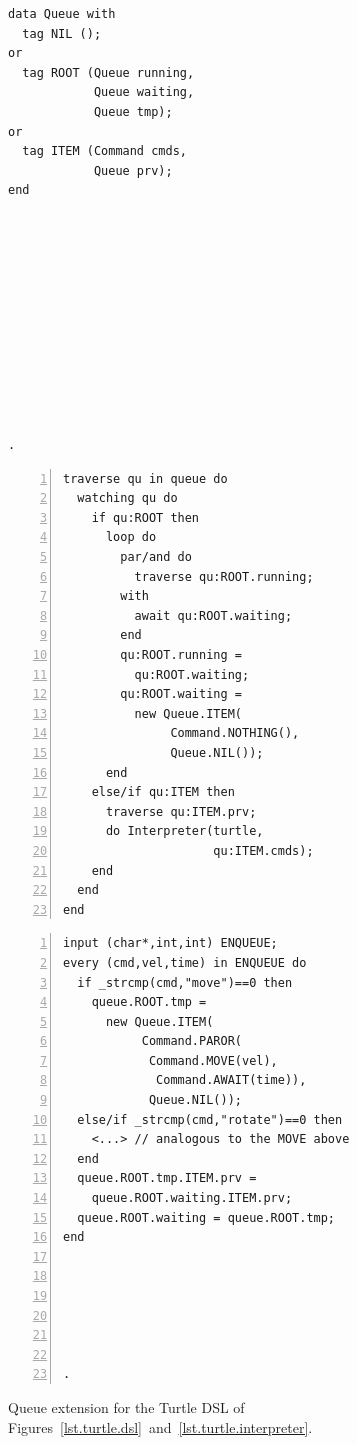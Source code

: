 \documentclass{sig-alternate}
\newcommand{\code}[1] {{\small{\texttt{#1}}}}
\begin{document}
\begin{figure}%
\begin{minipage}[t]{0.22\linewidth}
\begin{lstlisting}[title=CODE-1: The \code{Queue} data type]
data Queue with
  tag NIL ();
or
  tag ROOT (Queue running,
            Queue waiting,
            Queue tmp);
or
  tag ITEM (Command cmds,
            Queue prv);
end












.
\end{lstlisting}
\end{minipage}
%
\begin{minipage}[t]{0.36\linewidth}
\begin{lstlisting}[numbers=left,xleftmargin=3.5em,title=CODE-2: Queue traversal]
traverse qu in queue do
  watching qu do
    if qu:ROOT then
      loop do
        par/and do
          traverse qu:ROOT.running;
        with
          await qu:ROOT.waiting;
        end
        qu:ROOT.running =
          qu:ROOT.waiting;
        qu:ROOT.waiting =
          new Queue.ITEM(
               Command.NOTHING(),
               Queue.NIL());
      end
    else/if qu:ITEM then
      traverse qu:ITEM.prv;
      do Interpreter(turtle,
                     qu:ITEM.cmds);
    end
  end
end
\end{lstlisting}
\end{minipage}
%
\begin{minipage}[t]{0.39\linewidth}
\begin{lstlisting}[numbers=left,xleftmargin=3.5em,title=CODE-3: Command enqueuing]
input (char*,int,int) ENQUEUE;
every (cmd,vel,time) in ENQUEUE do
  if _strcmp(cmd,"move")==0 then
    queue.ROOT.tmp =
      new Queue.ITEM(
           Command.PAROR(
            Command.MOVE(vel),
             Command.AWAIT(time)),
            Queue.NIL());
  else/if _strcmp(cmd,"rotate")==0 then
    <...> // analogous to the MOVE above
  end
  queue.ROOT.tmp.ITEM.prv =
    queue.ROOT.waiting.ITEM.prv;
  queue.ROOT.waiting = queue.ROOT.tmp;
end






.
\end{lstlisting}
\end{minipage}
%
\caption{ Queue extension for the Turtle DSL of
          Figures~\ref{lst.turtle.dsl}~and~\ref{lst.turtle.interpreter}.
\label{lst.turtle.queue}
}
\end{figure}
\end{document}
